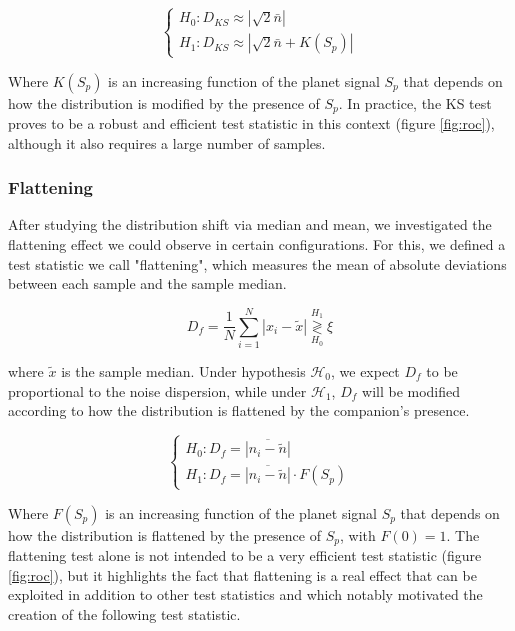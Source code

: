 \documentclass{article}
\begin{document}
$$
\begin{cases}
H_0 : D_{KS} \approx |\sqrt{2}\bar{n}|\\
H_1 : D_{KS} \approx |\sqrt{2}\bar{n} + K(S_p)|
\end{cases}
$$

Where $K(S_p)$ is an increasing function of the planet signal $S_p$ that depends on how the distribution is modified by the presence of $S_p$. In practice, the KS test proves to be a robust and efficient test statistic in this context (figure \ref{fig:roc}), although it also requires a large number of samples.



\subsubsection{Flattening}

After studying the distribution shift via median and mean, we investigated the flattening effect we could observe in certain configurations. For this, we defined a test statistic we call "flattening", which measures the mean of absolute deviations between each sample and the sample median.

$$
D_f = \frac 1 N \sum_{i=1}^N |x_i - \tilde{x}| \stackrel{H_1}{\underset{H_0}{\gtrless}} \xi
$$

where $\tilde{x}$ is the sample median. Under hypothesis $\mathcal{H}_0$, we expect $D_f$ to be proportional to the noise dispersion, while under $\mathcal{H}_1$, $D_f$ will be modified according to how the distribution is flattened by the companion's presence.

$$
\begin{cases}
H_0 : D_f = \overline{|n_i - \tilde{n}|}\\
H_1 : D_f = \overline{|n_i - \tilde{n}|} \cdot F(S_p)
\end{cases}
$$

Where $F(S_p)$ is an increasing function of the planet signal $S_p$ that depends on how the distribution is flattened by the presence of $S_p$, with $F(0)=1$. The flattening test alone is not intended to be a very efficient test statistic (figure \ref{fig:roc}), but it highlights the fact that flattening is a real effect that can be exploited in addition to other test statistics and which notably motivated the creation of the following test statistic.

\end{document}
